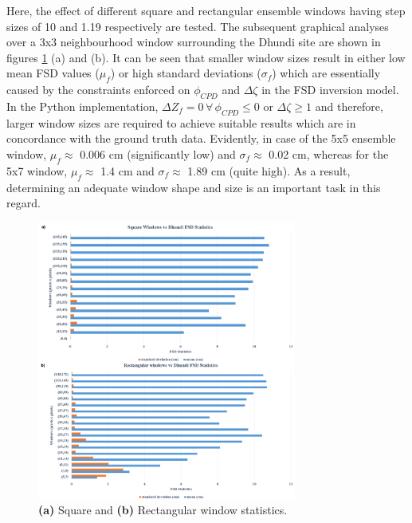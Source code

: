 \documentclass{article}
\begin{document}
Here, the effect of different square and rectangular ensemble windows having step sizes of 10 and 1.19 respectively are tested. The subsequent graphical analyses over a 3x3 neighbourhood window surrounding the Dhundi site are shown in figures \ref{fig:fsd_graph}{ (a) and (b)}. It can be seen that smaller window sizes result in either low mean FSD values ($\mu_f$) or high standard deviations ($\sigma_f$) which are essentially caused by the constraints enforced on $\phi_{CPD}$ and $\Delta{\zeta}$ in the FSD inversion model. In the Python implementation, $\Delta{Z_f} = 0 \, \forall \, \phi_{CPD} \le 0 \text{ or } \Delta{\zeta} \ge 1$ and therefore, larger window sizes are required to achieve suitable results which are in concordance with the ground truth data. Evidently, in case of the 5x5 ensemble window, $\mu_f \approx$ 0.006 cm (significantly low) and $\sigma_f \approx$ 0.02 cm, whereas for the 5x7 window, $\mu_f \approx$ 1.4 cm and $\sigma_f \approx$ 1.89 cm (quite high). As a result, determining an adequate window shape and size is an important task in this regard.
\begin{figure}[htb]
\centering
\includegraphics[width=8.5cm]{Pictures/Graphs.png}
\vspace{-2ex}
\caption{\textbf{(a)} Square and \textbf{(b)} Rectangular window statistics.}
\label{fig:fsd_graph}
\end{figure}
\end{document}
